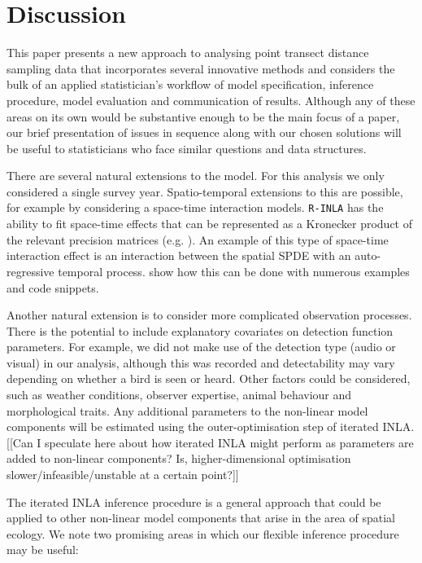 \documentclass[preprint,12pt]{elsarticle}
\begin{document}
\section{Discussion}

This paper presents a new approach to analysing point transect distance sampling data that incorporates several innovative methods and considers the bulk of an applied statistician's workflow of model specification, inference procedure, model evaluation and communication of results.  Although any of these areas on its own would be substantive enough to be the main focus of a paper, our brief presentation of issues in sequence along with our chosen solutions will be useful to statisticians who face similar questions and data structures.

There are several natural extensions to the model.  For this analysis we only considered a single survey year.  Spatio-temporal extensions to this are possible, for example by considering a space-time interaction models.  \texttt{R-INLA} has the ability to fit space-time effects that can be represented as a Kronecker product of the relevant precision matrices (e.g. \citep{yuan_point_2017}).  An example of this type of space-time interaction effect is an interaction between the spatial SPDE with an auto-regressive temporal process.  \cite{blangiardo_spatial_2013} show how this can be done with numerous examples and code snippets.  

Another natural extension is to consider more complicated observation processes.  There is the potential to include explanatory covariates on detection function parameters.  For example, we did not make use of the detection type (audio or visual) in our analysis, although this was recorded and detectability may vary depending on whether a bird is seen or heard.  Other factors could be considered, such as weather conditions, observer expertise, animal behaviour and morphological traits.  Any additional parameters to the non-linear model components will be estimated using the outer-optimisation step of iterated INLA.  [[Can I speculate here about how iterated INLA might perform as parameters are added to non-linear components?  Is, higher-dimensional optimisation slower/infeasible/unstable at a certain point?]]  

The iterated INLA inference procedure is a general approach that could be applied to other non-linear model components that arise in the area of spatial ecology.  We note two promising areas in which our flexible inference procedure may be useful:
\end{document}
